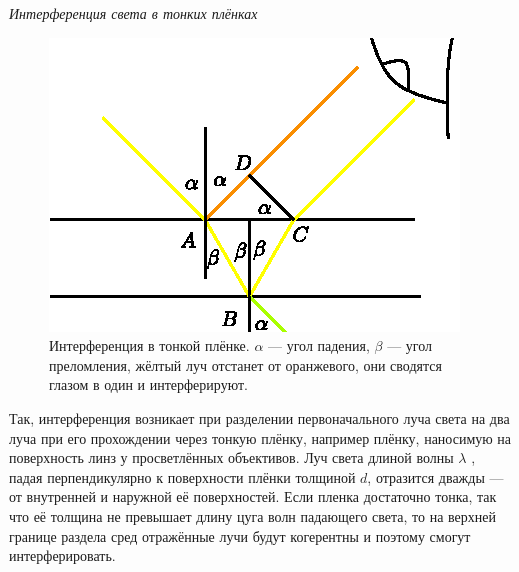 ﻿\documentclass[__main__.tex]{subfiles}
\begin{document}
\textit{Интерференция света в тонких плёнках}\\
\begin{figure}[h]
	\includegraphics[width=1\linewidth]{img/o-05.eps}
	\caption{Интерференция в тонкой плёнке. $\alpha$ — угол падения, $\beta$ — угол преломления, жёлтый луч отстанет от оранжевого, они сводятся глазом в один и интерферируют.}
\end{figure}
Так, интерференция возникает при разделении первоначального луча света на два луча при его прохождении через тонкую плёнку, например плёнку, наносимую на поверхность линз у просветлённых объективов. Луч света длиной волны $\lambda$ , падая перпендикулярно к поверхности плёнки толщиной $d$, отразится дважды — от внутренней и наружной её поверхностей. Если пленка достаточно тонка, так что её толщина не превышает длину цуга волн падающего света, то на верхней границе раздела сред отражённые лучи будут когерентны и поэтому смогут интерферировать.
\end{document}
